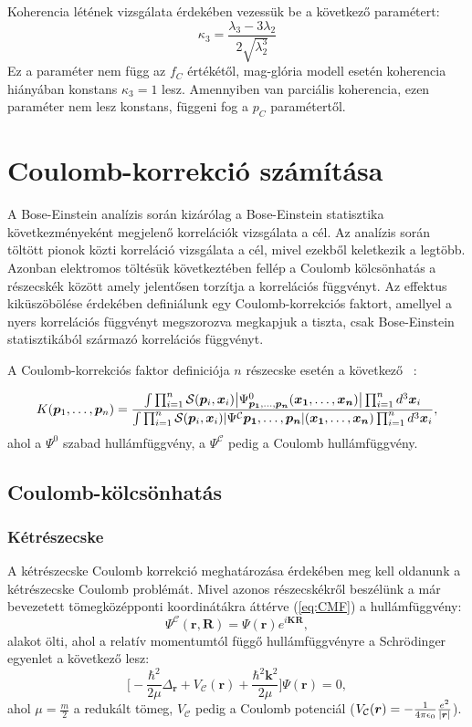 \documentclass[11pt,a4paper]{article}
\numberwithin{equation}{subsection}
\numberwithin{figure}{section}
\begin{document}
Koherencia létének vizsgálata érdekében vezessük be a következő paramétert:
\begin{equation}
\kappa_3 = \frac{\lambda_3-3\lambda_2}{2\sqrt{\lambda_2^3}}
\end{equation}
Ez a paraméter nem függ az $f_C$ értékétől, mag-glória modell esetén koherencia hiányában konstans $\kappa_3=1$ lesz. Amennyiben van parciális koherencia, ezen paraméter nem lesz konstans, függeni fog a $p_C$ paramétertől.


\section{Coulomb-korrekció számítása}
A Bose-Einstein analízis során kizárólag a Bose-Einstein statisztika következményeként megjelenő korrelációk vizsgálata a cél. Az analízis során töltött pionok közti korreláció vizsgálata a cél, mivel ezekből keletkezik a legtöbb. Azonban elektromos töltésük következtében fellép a Coulomb kölcsönhatás a részecskék között amely jelentősen torzítja a korrelációs függvényt. Az effektus kiküszöbölése érdekében definiálunk egy Coulomb-korrekciós faktort, amellyel a nyers korrelációs függvényt megszorozva megkapjuk a tiszta, csak Bose-Einstein statisztikából származó korrelációs függvényt.

A Coulomb-korrekciós faktor definiciója $n$ részecske esetén a következő ~\cite{Alt:2001dj}:

\begin{equation}
K(\bm{p}_1,\dots,\bm{p}_n)=
\frac{
\int \prod_{i=1}^n\mathcal{S}(\bm{p}_i, \bm{x}_i)
\abs{\Psi^{0}_{\bm{p_1},\dots,\bm{p_n}}(\bm{x_1},\dots,\bm{x_n})}\prod_{i=1}^n d^3 \bm{x}_i
}{\int \prod_{i=1}^n\mathcal{S}(\bm{p}_i, \bm{x}_i)
\abs{\Psi^\mathcal{C}\bm{p_1},\dots,\bm{p_n}}(\bm{x_1},\dots,\bm{x_n})\prod_{i=1}^n d^3 \bm{x}_i},
\label{eq:Kn}
\end{equation}
ahol a $\Psi^0$ szabad hullámfüggvény, a $\Psi^\mathcal{C}$ pedig a Coulomb hullámfüggvény.

\subsection{Coulomb-kölcsönhatás}
\subsubsection{Kétrészecske}
A kétrészecske Coulomb korrekció meghatározása érdekében meg kell oldanunk a kétrészecske Coulomb problémát. Mivel azonos részecskékről beszélünk a már bevezetett tömegközépponti koordinátákra áttérve (\ref{eq:CMF})  a hullámfüggvény:
\begin{equation}
\Psi^\mathcal{C}(\bm{r},\bm{R}) = \Psi(\bm{r})e^{i\bm{KR}},
\end{equation}
alakot ölti, ahol a relatív momentumtól függő hullámfüggvényre a Schrödinger egyenlet a következő lesz:
\begin{equation}
\bigg[-\frac{\hbar^2}{2\mu}\Delta_{\bm{r}}+V_\mathcal{C}(\bm{r})+\frac{\hbar^2\bm{k}^2}{2\mu}\bigg]\Psi(\bm{r})=0,
\end{equation}
ahol $\mu=\frac{m}{2}$ a redukált tömeg, $V_\mathcal{C}$ pedig a Coulomb potenciál \big($V_\mathcal{C}(\bm{r}) = -\frac{1}{4\pi\epsilon_0}\frac{e^2}{\abs{\bm{r}}}$\big).
\end{document}
